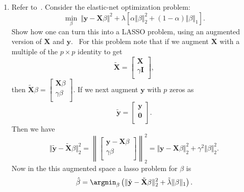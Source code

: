 \documentclass[10pt]{article}
\begin{document}
\begin{enumerate}[1.]
\begin{itemize}
    	\end{itemize}
		\item Refer to~\cite[Ex. 3.30]{hastie2009elements}. Consider the elastic-net optimization problem:
		\begin{equation}
			\min_{\beta}~\Vert\mathbf{y}-\mathbf{X}\beta\Vert^{2} + \lambda\left[ \alpha\Vert\beta\Vert_{2}^{2} + (1-\alpha)\Vert\beta\Vert_{1}\right]. 
		\end{equation}
		Show how one can turn this into a LASSO problem, using an augmented
version of $\mathbf{X}$ and $\mathbf{y}$.~ 
\sol
For this problem note that if we augment $\mathbf{X}$ with a multiple of the $p\times p$ identity to get
\begin{equation}
	\tilde{\mathbf{X}} = \left[ \begin{array}{c}
	\mathbf{X}\\
	\gamma\mathbf{I}\\
	\end{array}\right],
\end{equation} 
then $\tilde{\mathbf{X}}\beta = \left[\begin{array}{c}
\mathbf{X}\beta\\
\gamma\beta\\
\end{array} \right] $. If we next augment $\mathbf{y}$ with $p$ zeros as 
\begin{equation*}
	\tilde{\mathbf{y}} = \left[ \begin{array}{c}
	\mathbf{y}\\
	\mathbf{0}\\
	\end{array}\right].
\end{equation*}
Then we have
\begin{equation}\label{eq: s8-1}
	\Vert\tilde{\mathbf{y}}-\tilde{\mathbf{X}}\beta\Vert_{2}^{2} = \left\| \left[ \begin{array}{c}
	\mathbf{y}-\mathbf{X}\beta\\
	\gamma\beta\\
	\end{array}\right] \right\|_{2}^{2} = \Vert\mathbf{y}-\mathbf{X}\beta\Vert_{2}^{2} + \gamma^{2}\Vert\beta\Vert_{2}^{2}.
\end{equation}
Now in the this augmented space a lasso problem for $\beta$ is 
\begin{equation*}
	\hat{\beta} = \argmin_{\beta} \left( \Vert\tilde{\mathbf{y}}-\tilde{\mathbf{X}}\beta\Vert_{2}^{2} +\tilde{\lambda}\Vert\beta\Vert_{1}\right).
\end{equation*}

\end{enumerate}
\end{document}
